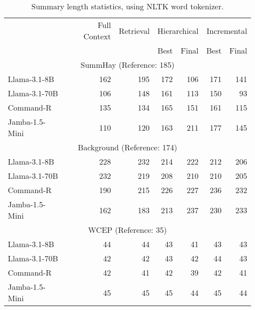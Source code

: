 \begin{table*}[t]
    \centering
    \begin{tabular}{lrrrrrr}
    \toprule
    & Full Context & Retrieval & \multicolumn{2}{r}{Hierarchical} & \multicolumn{2}{r}{Incremental}\\
    & & & Best & Final & Best & Final \\
    \midrule
    \multicolumn{7}{c}{SummHay (Reference: 185)} \\
    \midrule
    Llama-3.1-8B & 162 & 195 & 172 & 106 & 171 & 141 \\
    Llama-3.1-70B & 106 & 148 & 161 & 113 & 150 & 93 \\
    Command-R & 135 & 134 & 165 & 151 & 161 & 115 \\
    Jamba-1.5-Mini & 110 & 120 & 163 & 211 & 177 & 145 \\
    \midrule
    \multicolumn{7}{c}{Background (Reference: 174)} \\
    \midrule
    Llama-3.1-8B & 228 & 232 & 214 & 222 & 212 & 206 \\
    Llama-3.1-70B & 232 & 219 & 208 & 210 & 210 & 205 \\
    Command-R & 190 & 215 & 226 & 227 & 236 & 232 \\
    Jamba-1.5-Mini & 162 & 183 & 213 & 237 & 230 & 233 \\
    \midrule
    \multicolumn{7}{c}{WCEP (Reference: 35)} \\
    \midrule
    Llama-3.1-8B & 44 & 44 & 43 & 41 & 43 & 43 \\
    Llama-3.1-70B & 42 & 42 & 43 & 42 & 44 & 43 \\
    Command-R & 42 & 41 & 42 & 39 & 42 & 41 \\
    Jamba-1.5-Mini & 45 & 45 & 45 & 44 & 45 & 44 \\
    \bottomrule
    \end{tabular}
    \caption{Summary length statistics, using NLTK word tokenizer.}
    \label{tab:summary_len_stats}
\end{table*}